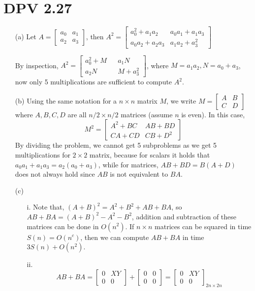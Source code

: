 \documentclass[twoside]{homework}
\begin{document}
\section{DPV 2.27}
\begin{enumerate}
	\item [(a)] Let $A = \begin{bmatrix}
		a_0 & a_1 \\ a_2 & a_3
	\end{bmatrix}$, then $A^2 = \begin{bmatrix}
		a_0^2 + a_1a_2 & a_0a_1 + a_1a_3 \\ a_0a_2 + a_2a_3 & a_1a_2 + a_3^2
	\end{bmatrix}$

	By inspection, $A^2 = \begin{bmatrix}
		a_0^2 + M && a_1N \\ a_2N && M + a_3^2
	\end{bmatrix}$, where $M = a_1a_2, N = a_0 + a_3$, now only 5 multiplications are sufficient to compute $A^2$.

	\item [(b)] Using the same notation for a $n\times n$ matrix $M$, we write $M = \begin{bmatrix}
		A & B \\ C & D
	\end{bmatrix}$
	where $A, B, C, D$ are all $n/2 \times n/2$ matrices (assume $n$ is even).
	In this case,
	\[M^2 = \begin{bmatrix}
		A^2 + BC & AB + BD \\ CA + CD & CB + D^2
	\end{bmatrix}\]
	By dividing the problem, we cannot get 5 subproblems as we get 5 multiplications for $2\times 2$ matrix, because for scalars it holds that $a_0a_1 + a_1a_3 = a_2(a_0 + a_3)$, while for matrices, $AB + BD = B(A + D)$ does not always hold since $AB$ is not equivalent to $BA$.

	\item [(c)]
		\begin{enumerate}
			\item [i.] Note that, $(A+B)^2 = A^2 + B^2 + AB + BA$, so $AB +BA = (A+B)^2 - A^2 - B^2$, addition and subtraction of these matrices can be done in $O(n^2)$. If $n\times n$ matrices can be squared in time $S(n) = O(n^c)$, then we can compute $AB+BA$ in time $3S(n) + O(n^2)$.
			\item [ii.] \[ AB + BA = \begin{bmatrix}
				0 & XY \\ 0 & 0
			\end{bmatrix} + \begin{bmatrix}
				0 & 0 \\ 0 & 0
			\end{bmatrix} = \begin{bmatrix}
				0 & XY \\ 0 & 0
			\end{bmatrix}_{2n \times 2n}\]


\end{enumerate}
\end{enumerate}
\end{document}
